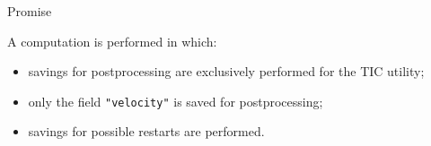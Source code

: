         {Promise} \\


A computation is performed in which:

\begin{itemize}
\item
savings for postprocessing are exclusively performed for the TIC utility;
\item
only the field \verb+"velocity"+ is saved for postprocessing;
\item
savings for possible restarts are performed.
\end{itemize}



